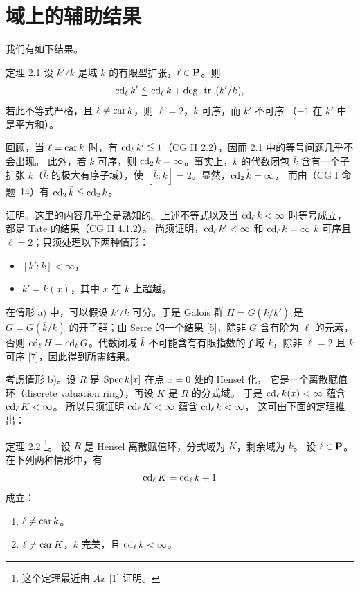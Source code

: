 \section{域上的辅助结果}\pageoriginale

我们有如下结果。

\begin{enonce*}{定理 2.1}
设 $k'/k$ 是域 $k$ 的有限型扩张，$\ell\in \mathbf{P}$。则
$$
\operatorname{cd}_{\ell}k'\leqq \operatorname{cd}_{\ell}k+\deg.\operatorname{tr}.(k'/k){},
$$
若此不等式严格，且 $\ell\neq \operatorname{car} k$，则 $\ell=2$，$k$ 可序，而 $k'$ 不可序
（\ie $-1$ 在 $k'$ 中是平方和）。
\end{enonce*}

回顾，当 $\ell=\operatorname{car} k$ 时，有 $\operatorname{cd}_{\ell}k'\leqq 1$（CG II
\hyperref[X.thm2.2]{2.2}），因而 \hyperref[X.thm2.1]{2.1} 中的等号问题几乎不会出现。
此外，若 $k$ 可序，则 $\operatorname{cd}_2k=\infty$。事实上，$k$ 的代数闭包 $\bar{k}$ 含有一个子扩张
$\widetilde{k}$（$\bar{k}$ 的极大有序子域），使
$[\bar{k}:\widetilde{k}]=2$。显然，$\operatorname{cd}_2\widetilde{k}=\infty$，
而由（CG I 命题~14）有 $\operatorname{cd}_2\widetilde{k}\leqq \operatorname{cd}_2 k$。

证明。这里的内容几乎全是熟知的。上述不等式以及当
$\operatorname{cd}_{\ell}k<\infty$ 时等号成立，都是 Tate 的结果（CG II 4.1.2）。
尚须证明，$\operatorname{cd}_{\ell}k'<\infty$ 和 $\operatorname{cd}_{\ell}k=\infty$
 $k$ 可序且 $\ell=2$；只须处理以下两种情形：
\begin{itemize}
\item[a)] $[k':k]<\infty$，

\item[b)] $k'=k(x)$，其中 $x$ 在 $k$ 上超越。
\end{itemize}
在情形 a) 中，可以假设 $k'/k$ 可分。于是 Galois 群 $H=G(\bar{k}/k')$
是 $G=G(\bar{k}/k)$ 的开子群；由 Serre 的一个结果 [5]，除非 $G$ 含有阶为
$\ell$ 的元素，否则 $\operatorname{cd}_{\ell}H=\operatorname{cd}_{\ell}G$。代数闭域 $\bar{k}$
不可能含有有限指数的子域 $\widetilde{k}$，除非 $\ell=2$ 且
$\widetilde{k}$ 可序 [7]，因此得到所需结果。

考虑\pageoriginale 情形 b)。设 $R$ 是 $\operatorname{Spec} k[x]$ 在点 $x=0$ 处的 Hensel 化，
它是一个离散赋值环（discrete valuation ring），再设 $K$ 是 $R$ 的分式域。
于是 $\operatorname{cd}_{\ell}k(x)<\infty$ 蕴含 $\operatorname{cd}_{\ell}K<\infty$。
所以只须证明 $\operatorname{cd}_{\ell}K<\infty$ 蕴含 $\operatorname{cd}_{\ell}k<\infty$，
这可由下面的定理推出：

\begin{enonce*}{定理 2.2}
\footnote{这个定理最近由 $Ax$ [1] 证明。}。
设 $R$ 是 Hensel 离散赋值环，分式域为 $K$，剩余域为 $k$。
设 $\ell\in \mathbf{P}$。在下列两种情形中，有
$$
\operatorname{cd}_{\ell}K=\operatorname{cd}_{\ell}k+1
$$
成立：
\begin{enumerate}
\renewcommand{\theenumi}{\roman{enumi}}
\renewcommand{\labelenumi}{(\theenumi)}
\item $\ell\neq \operatorname{car} k$。

\item $\ell \neq \operatorname{car} K$，$k$ 完美，且 $\operatorname{cd}_{\ell}k<\infty$。
\end{enumerate}
\end{enonce*}

